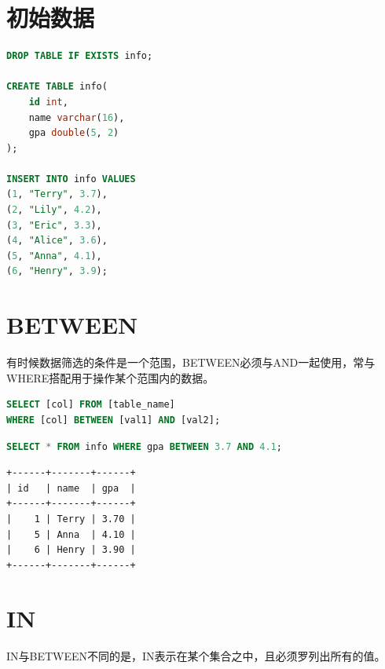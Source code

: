 \documentclass[12pt, openany, oneside]{book}
\begin{document}
\section{初始数据}


\begin{lstlisting}[language=SQL]
DROP TABLE IF EXISTS info;

CREATE TABLE info(
    id int,
    name varchar(16),
    gpa double(5, 2)
);

INSERT INTO info VALUES
(1, "Terry", 3.7),
(2, "Lily", 4.2),
(3, "Eric", 3.3),
(4, "Alice", 3.6),
(5, "Anna", 4.1),
(6, "Henry", 3.9);
\end{lstlisting}

\section{BETWEEN}

有时候数据筛选的条件是一个范围，BETWEEN必须与AND一起使用，常与WHERE搭配用于操作某个范围内的数据。

\vspace{-0.5cm}

\begin{lstlisting}[language=SQL]
SELECT [col] FROM [table_name]
WHERE [col] BETWEEN [val1] AND [val2];
\end{lstlisting}

\vspace{0.5cm}


\begin{lstlisting}[language=SQL]
SELECT * FROM info WHERE gpa BETWEEN 3.7 AND 4.1;
\end{lstlisting}

\begin{tcolorbox}
    \begin{verbatim}
+------+-------+------+
| id   | name  | gpa  |
+------+-------+------+
|    1 | Terry | 3.70 |
|    5 | Anna  | 4.10 |
|    6 | Henry | 3.90 |
+------+-------+------+
    \end{verbatim}
\end{tcolorbox}

\section{IN}

IN与BETWEEN不同的是，IN表示在某个集合之中，且必须罗列出所有的值。
\end{document}
